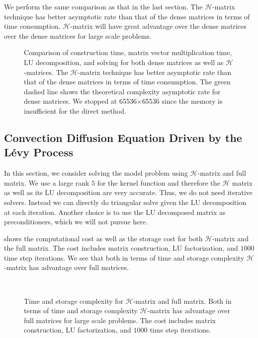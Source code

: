 \documentclass[3p,,preprint,12pt]{elsarticle}
\theoremstyle{definition}
\begin{document}
We perform the same comparison as that in the last section. The $\mathcal{H}$-matrix technique has better asymptotic rate than that of the dense matrices in terms of time consumption. $\mathcal{H}$-matrix will have great advantage over the dense matrices over the dense matrices for large scale problems. 
\begin{figure}[htpb]
\centering
\scalebox{0.6}{}
\caption{Comparison of construction time, matrix vector multiplication time, LU decomposition, and solving for both dense matrices as well as $\mathcal{H}$-matrices. The $\mathcal{H}$-matrix technique has better asymptotic rate than that of the dense matrices in terms of time consumption. The green dashed line shows the theoretical complexity asymptotic rate for dense matrices. We stopped at 65536$\times$65536 since the memory is insufficient for the direct method.}
\label{fig:solve}
\end{figure}


\subsection{Convection Diffusion Equation Driven by the L\'evy Process}

In this section, we consider solving the model problem using $\mathcal{H}$-matrix and full matrix. We use a large rank $5$ for the kernel function and therefore the $\mathcal{H}$ matrix as well as its LU decomposition are very accurate. Thus, we do not need iterative solvers. Instead we can directly do triangular solve given the LU decomposition at each iteration. Another choice is to use the LU decomposed matrix as preconditioners, which we will not pursue here.  

 shows the computational cost as well as the storage cost for both $\mathcal{H}$-matrix and the full matrix. The cost includes matrix construction, LU factorization, and $1000$ time step iterations. We see that both in terms of time and storage complexity $\mathcal{H}$-matrix has advantage over full matrices.

\begin{figure}[htpb]
\centering
\scalebox{0.4}{}~
\scalebox{0.4}{}

\caption{Time and storage complexity for $\mathcal{H}$-matrix and full matrix. Both in terms of time and storage complexity $\mathcal{H}$-matrix has advantage over full matrices for large scale problems. The cost includes matrix construction, LU factorization, and $1000$ time step iterations.}
\label{fig:s}
\end{figure}
\end{document}
